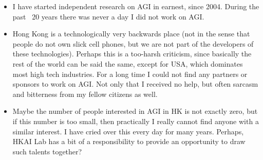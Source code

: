 \begin{preview}
\begin{minipage}{\textwidth}
\begin{itemize}
	\item I have started independent research on AGI in earnest, since 2004.  During the past ~20 years there was never a day I did not work on AGI.
	
	\item Hong Kong is a technologically very backwards place (not in the sense that people do not own slick cell phones, but we are not part of the developers of these technologies).  Perhaps this is a too-harsh criticism, since basically the rest of the world can be said the same, except for USA, which dominates most high tech industries.  For a long time I could not find any partners or sponsors to work on AGI.  Not only that I received no help, but often sarcasm and bitterness from my fellow citizens as well.
	
	\item Maybe the number of people interested in AGI in HK is not exactly zero, but if this number is too small, then practically I really cannot find anyone with a similar interest.  I have cried over this every day for many years.  Perhaps, HKAI Lab has a bit of a responsibility to provide an opportunity to draw such talents together?
	
\end{itemize}
\end{minipage}
\end{preview}

